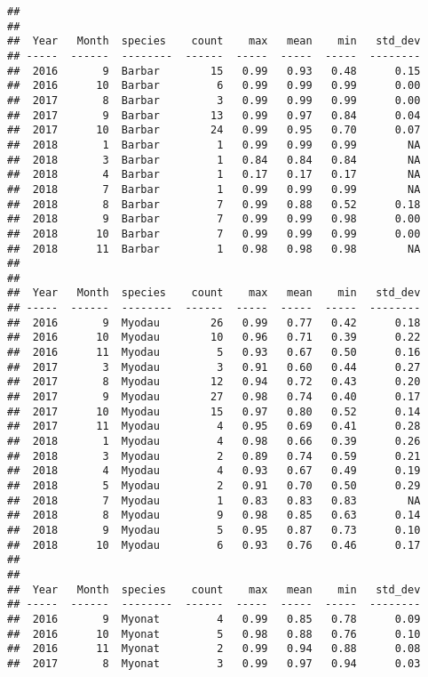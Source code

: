 \documentclass[]{article}
\begin{document}
\begin{verbatim}
## 
## 
##  Year   Month  species    count    max   mean    min   std_dev
## -----  ------  --------  ------  -----  -----  -----  --------
##  2016       9  Barbar        15   0.99   0.93   0.48      0.15
##  2016      10  Barbar         6   0.99   0.99   0.99      0.00
##  2017       8  Barbar         3   0.99   0.99   0.99      0.00
##  2017       9  Barbar        13   0.99   0.97   0.84      0.04
##  2017      10  Barbar        24   0.99   0.95   0.70      0.07
##  2018       1  Barbar         1   0.99   0.99   0.99        NA
##  2018       3  Barbar         1   0.84   0.84   0.84        NA
##  2018       4  Barbar         1   0.17   0.17   0.17        NA
##  2018       7  Barbar         1   0.99   0.99   0.99        NA
##  2018       8  Barbar         7   0.99   0.88   0.52      0.18
##  2018       9  Barbar         7   0.99   0.99   0.98      0.00
##  2018      10  Barbar         7   0.99   0.99   0.99      0.00
##  2018      11  Barbar         1   0.98   0.98   0.98        NA
## 
## 
##  Year   Month  species    count    max   mean    min   std_dev
## -----  ------  --------  ------  -----  -----  -----  --------
##  2016       9  Myodau        26   0.99   0.77   0.42      0.18
##  2016      10  Myodau        10   0.96   0.71   0.39      0.22
##  2016      11  Myodau         5   0.93   0.67   0.50      0.16
##  2017       3  Myodau         3   0.91   0.60   0.44      0.27
##  2017       8  Myodau        12   0.94   0.72   0.43      0.20
##  2017       9  Myodau        27   0.98   0.74   0.40      0.17
##  2017      10  Myodau        15   0.97   0.80   0.52      0.14
##  2017      11  Myodau         4   0.95   0.69   0.41      0.28
##  2018       1  Myodau         4   0.98   0.66   0.39      0.26
##  2018       3  Myodau         2   0.89   0.74   0.59      0.21
##  2018       4  Myodau         4   0.93   0.67   0.49      0.19
##  2018       5  Myodau         2   0.91   0.70   0.50      0.29
##  2018       7  Myodau         1   0.83   0.83   0.83        NA
##  2018       8  Myodau         9   0.98   0.85   0.63      0.14
##  2018       9  Myodau         5   0.95   0.87   0.73      0.10
##  2018      10  Myodau         6   0.93   0.76   0.46      0.17
## 
## 
##  Year   Month  species    count    max   mean    min   std_dev
## -----  ------  --------  ------  -----  -----  -----  --------
##  2016       9  Myonat         4   0.99   0.85   0.78      0.09
##  2016      10  Myonat         5   0.98   0.88   0.76      0.10
##  2016      11  Myonat         2   0.99   0.94   0.88      0.08
##  2017       8  Myonat         3   0.99   0.97   0.94      0.03

\end{verbatim}
\end{document}
